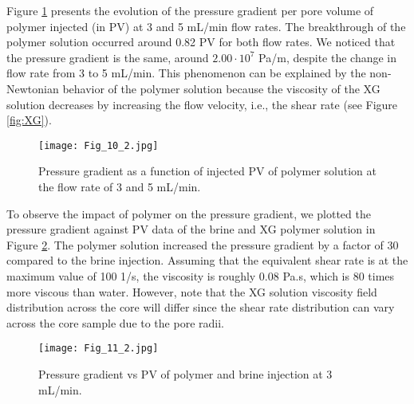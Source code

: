 \documentclass{article}
\begin{document}
Figure \ref{fig:dif_flow_rate_inj} presents the evolution of the pressure gradient per pore volume of polymer injected (in PV) at 3 and 5 mL/min flow rates. The breakthrough of the polymer solution occurred around 0.82 PV for both flow rates. We noticed that the pressure gradient is the same, around $2.00 \cdot 10^{7}$ Pa/m, despite the change in flow rate from 3 to 5 mL/min. This phenomenon can be explained by the non-Newtonian behavior of the polymer solution because the viscosity of the XG solution decreases by increasing the flow velocity, i.e., the shear rate (see Figure \ref{fig:XG}). 

\begin{figure}[htbp]
\begin{centering}
\texttt{[image: Fig\_10\_2.jpg]}
\par\end{centering}
\caption{Pressure gradient as a function of injected PV of polymer solution at the flow rate of 3 and 5 mL/min.
\label{fig:dif_flow_rate_inj}}
\end{figure}

To observe the impact of polymer on the pressure gradient, we plotted the pressure gradient against PV data of the brine and XG polymer solution in Figure \ref{fig:brine_vs_XG}. The polymer solution increased the pressure gradient by a factor of 30 compared to the brine injection. Assuming that the equivalent shear rate is at the maximum value of 100 1/s, the viscosity is roughly 0.08 Pa.s, which is 80 times more viscous than water. However, note that the XG solution viscosity field distribution across the core will differ since the shear rate distribution can vary across the core sample due to the pore radii.

\begin{figure}[H]
\begin{centering}
\texttt{[image: Fig\_11\_2.jpg]}
\par\end{centering}
\caption{Pressure gradient vs PV of polymer and brine injection at 3 mL/min.\label{fig:brine_vs_XG}}
\end{figure}
\end{document}
